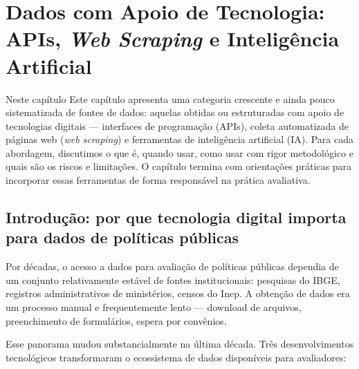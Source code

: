 
\chapter{Dados com Apoio de Tecnologia: APIs, \textit{Web Scraping} e Inteligência Artificial}

\begin{boxdestaque}{Neste capítulo}
Este capítulo apresenta uma categoria crescente e ainda pouco sistematizada de fontes de dados: aquelas obtidas ou estruturadas com apoio de tecnologias digitais --- interfaces de programação (APIs), coleta automatizada de páginas web (\textit{web scraping}) e ferramentas de inteligência artificial (IA). Para cada abordagem, discutimos o que é, quando usar, como usar com rigor metodológico e quais são os riscos e limitações. O capítulo termina com orientações práticas para incorporar essas ferramentas de forma responsável na prática avaliativa.
\end{boxdestaque}

\section{Introdução: por que tecnologia digital importa para dados de políticas públicas}

Por décadas, o acesso a dados para avaliação de políticas públicas dependia de um conjunto relativamente estável de fontes institucionais: pesquisas do IBGE, registros administrativos de ministérios, censos do Inep. A obtenção de dados era um processo manual e frequentemente lento --- download de arquivos, preenchimento de formulários, espera por convênios.

Esse panorama mudou substancialmente na última década. Três desenvolvimentos tecnológicos transformaram o ecossistema de dados disponíveis para avaliadores:

